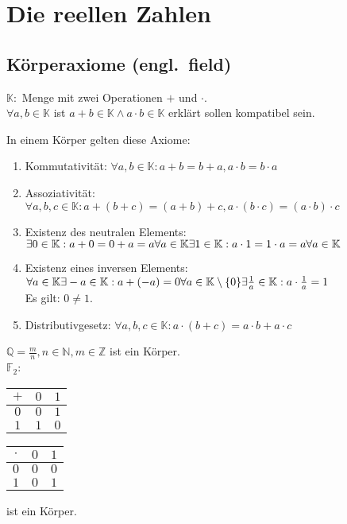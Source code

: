 \documentclass[../ana1.tex]{subfiles}
\begin{document}
\setcounter{section}{2}

\section{Die reellen Zahlen}
\subsection{Körperaxiome (engl.\ field)}
\(\mathbb{K:}\) Menge mit zwei Operationen \glqq{}\(+\)\grqq{} und \glqq{}\(\cdot \)\grqq{}.\\
\(\forall a,b \in \mathbb{K}\) ist \(a+b\in \mathbb{K} \wedge a\cdot b \in \mathbb{K}\) erklärt sollen kompatibel sein.
\begin{defi}[Körperaxiome]
	In einem Körper gelten diese Axiome:
	\begin{enumerate}
		\item Kommutativität: \(\forall a,b\in \mathbb{K}: a+b=b+a, a\cdot b=b\cdot a\)
		\item Assoziativität: \(\forall a,b,c\in \mathbb{K}: a+(b+c) = (a+b)+c, a\cdot (b\cdot c) = (a\cdot b)\cdot c\)
		\item Existenz des neutralen Elements: \\
		      \(\exists 0 \in \mathbb{K}: a + 0 = 0 + a = a \forall a\in \mathbb{K}\\
			      \exists 1 \in \mathbb{K}: a \cdot 1 = 1 \cdot a = a \forall a\in\mathbb{K}\)
		\item Existenz eines inversen Elements:\\
		      \(\forall a\in\mathbb{K}\exists -a\in\mathbb{K}:a+ (-a)=0\\
			      \forall a\in\mathbb{K} \setminus \{0\} \exists \frac{1}{a}\in\mathbb{K}:a\cdot\frac{1}{a}=1\) \\
		      Es gilt: \(0\neq1\).
		\item Distributivgesetz: \(\forall a,b,c\in\mathbb{K}:a\cdot(b+c)=a\cdot b + a \cdot c\)
	\end{enumerate}
\end{defi}
\begin{bsp}
	\(\mathbb{Q} = \frac{m}{n}, n \in \mathbb{N}, m\in\mathbb{Z}\) ist ein Körper.\\
	\(\mathbb{F}_2\):
	\begin{tabular}{c|cc}
		\(+\) & \(0\) & \(1\) \\
		\hline
		\(0\) & \(0\) & \(1\) \\
		\(1\) & \(1\) & \(0\)
	\end{tabular}
	\begin{tabular}{c|cc}
		\(\cdot\) & \(0\) & \(1\) \\
		\hline
		\(0\)     & \(0\) & \(0\) \\
		\(1\)     & \(0\) & \(1\)
	\end{tabular}
	ist ein Körper.
\end{bsp}
\end{document}
